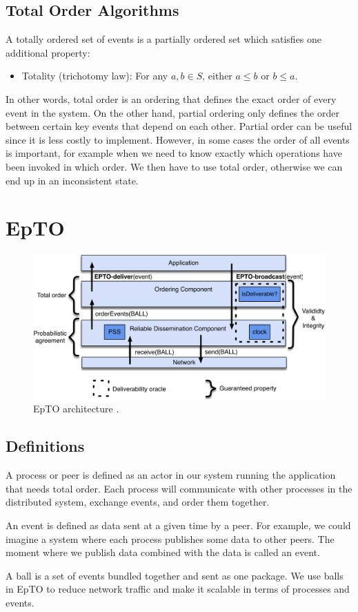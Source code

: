 \documentclass[10pt,conference,a4paper]{IEEEtran}
\begin{document}
\subsection{Total Order Algorithms}
A totally ordered set of events is a partially ordered set which satisfies one additional property:
\begin{itemize}
	\item Totality (trichotomy law): For any $a, b \in S$, either $a \leq b$  or $b \leq a$.
\end{itemize}
\par
In other words, total order is an ordering that defines the exact order of every event in the system. On the other hand, partial ordering only defines the order between certain key events that depend on each other. Partial order can be useful since it is less costly to implement. However, in some cases the order of all events is important, for example when we need to know exactly which operations have been invoked in which order. We then have to use total order, otherwise we can end up in an inconsistent state.

\section{EpTO}
\begin{figure}
	\includegraphics[width=\linewidth]{figures/architecture.pdf}
	\caption{EpTO architecture \autocite{matos2015epto}.}
	\label{fig:epto-architecture}
\end{figure}
\subsection{Definitions}
A process or peer is defined as an actor in our system running the application that needs total order. Each process will communicate with other processes in the distributed system, exchange events, and order them together.
\par
An event is defined as data sent at a given time by a peer. For example, we could imagine a system where each process publishes some data to other peers. The moment where we publish data combined with the data is called an event.
\par
A ball is a set of events bundled together and sent as one package. We use balls in EpTO to reduce network traffic and make it scalable in terms of processes and events.
\end{document}
